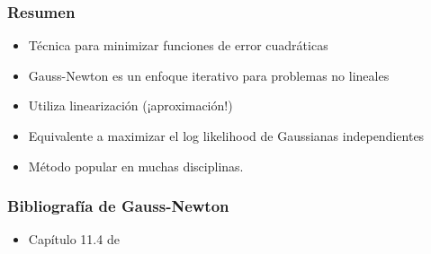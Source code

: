 \begin{frame}
    \frametitle{Resumen}
    
    \begin{itemize}
        \item Técnica para minimizar funciones de error cuadráticas
        \item Gauss-Newton es un enfoque iterativo para problemas no lineales
        \item Utiliza linearización (¡aproximación!)
        \item Equivalente a maximizar el log likelihood de Gaussianas independientes
        \item Método popular en muchas disciplinas.
    \end{itemize}

    
\end{frame}

\begin{frame}
    \frametitle{Bibliografía de Gauss-Newton}
    \begin{itemize}
        \item Capítulo 11.4 de \cite{thrun2005probabilistic}
    \end{itemize}
\end{frame}